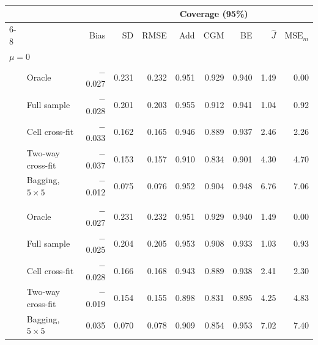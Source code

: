 \begin{tabular}{llrrrrrrrr}
\toprule
 &  & \multicolumn{3}{c}{} & \multicolumn{3}{c}{Coverage (95\%)} & \multicolumn{2}{c}{} \\ \cmidrule(lr){6-8}
 &  & Bias & SD & RMSE & Add & CGM & BE & $\widehat J$ & $\mathrm{MSE}_m$ \\
\midrule
\multicolumn{10}{l}{\emph{$\mu=0$}} \\
 & Oracle & $-$0.027 & 0.231 & 0.232 & 0.951 & 0.929 & 0.940 & 1.49 & 0.00 \\
 & Full sample & $-$0.028 & 0.201 & 0.203 & 0.955 & 0.912 & 0.941 & 1.04 & 0.92 \\
 & Cell cross-fit & $-$0.033 & 0.162 & 0.165 & 0.946 & 0.889 & 0.937 & 2.46 & 2.26 \\
 & Two-way cross-fit & $-$0.037 & 0.153 & 0.157 & 0.910 & 0.834 & 0.901 & 4.30 & 4.70 \\
 & Bagging, $5\times5$ & $-$0.012 & 0.075 & 0.076 & 0.952 & 0.904 & 0.948 & 6.76 & 7.06 \\
\addlinespace
\multicolumn{10}{l}{\emph{$\mu=1$}} \\
 & Oracle & $-$0.027 & 0.231 & 0.232 & 0.951 & 0.929 & 0.940 & 1.49 & 0.00 \\
 & Full sample & $-$0.025 & 0.204 & 0.205 & 0.953 & 0.908 & 0.933 & 1.03 & 0.93 \\
 & Cell cross-fit & $-$0.028 & 0.166 & 0.168 & 0.943 & 0.889 & 0.938 & 2.41 & 2.30 \\
 & Two-way cross-fit & $-$0.019 & 0.154 & 0.155 & 0.898 & 0.831 & 0.895 & 4.25 & 4.83 \\
 & Bagging, $5\times5$ & 0.035 & 0.070 & 0.078 & 0.909 & 0.854 & 0.953 & 7.02 & 7.40 \\
\bottomrule
\end{tabular}
